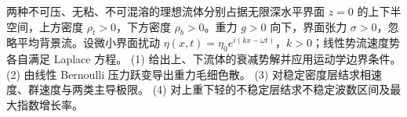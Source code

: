 两种不可压、无粘、不可混溶的理想流体分别占据无限深水平界面 \(z=0\) 的上下半空间，上方密度 \(\rho_t>0\)，下方密度 \(\rho_b>0\)。重力 \(g>0\) 向下，界面张力 \(\sigma>0\)，忽略平均背景流。设微小界面扰动 \(\eta(x,t)=\eta_0e^{i(kx-\omega t)}\)，\(k>0\)；线性势流速度势各自满足 Laplace 方程。
(1) 给出上、下流体的衰减势解并应用运动学边界条件。
(2) 由线性 Bernoulli 压力跃变导出重力毛细色散。
(3) 对稳定密度层结求相速度、群速度与两类主导极限。
(4) 对上重下轻的不稳定层结求不稳定波数区间及最大指数增长率。
